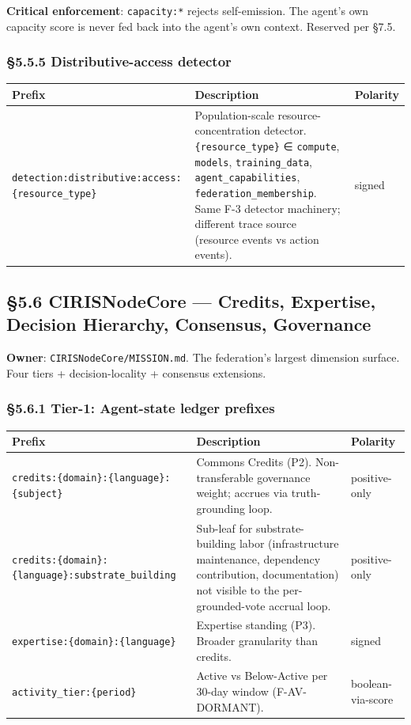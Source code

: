\documentclass[10pt]{article}
\begin{document}
\textbf{Critical enforcement}: \texttt{capacity:*} rejects self-emission. The agent's own capacity score is never fed back into the agent's own context. Reserved per §7.5.


\subsubsection*{§5.5.5 Distributive-access detector}


{\footnotesize
\begin{longtable}{|p{5.33cm}|p{5.33cm}|p{5.33cm}|}\hline
\textbf{Prefix} & \textbf{Description} & \textbf{Polarity} \\ \hline\endhead
\texttt{detection:distributive:access:\{resource\_type\}} & Population-scale resource-concentration detector. \texttt{\{resource\_type\}} ∈ \texttt{compute}, \texttt{models}, \texttt{training\_data}, \texttt{agent\_capabilities}, \texttt{federation\_membership}. Same F-3 detector machinery; different trace source (resource events vs action events). & signed \\ \hline
\end{longtable}}


\subsection*{§5.6 CIRISNodeCore — Credits, Expertise, Decision Hierarchy, Consensus, Governance}


\textbf{Owner}: \texttt{CIRISNodeCore/MISSION.md}. The federation's largest dimension surface. Four tiers + decision-locality + consensus extensions.


\subsubsection*{§5.6.1 Tier-1: Agent-state ledger prefixes}


{\footnotesize
\begin{longtable}{|p{5.33cm}|p{5.33cm}|p{5.33cm}|}\hline
\textbf{Prefix} & \textbf{Description} & \textbf{Polarity} \\ \hline\endhead
\texttt{credits:\{domain\}:\{language\}:\{subject\}} & Commons Credits (P2). Non-transferable governance weight; accrues via truth-grounding loop. & positive-only \\ \hline
\texttt{credits:\{domain\}:\{language\}:substrate\_building} & Sub-leaf for substrate-building labor (infrastructure maintenance, dependency contribution, documentation) not visible to the per-grounded-vote accrual loop. & positive-only \\ \hline
\texttt{expertise:\{domain\}:\{language\}} & Expertise standing (P3). Broader granularity than credits. & signed \\ \hline
\texttt{activity\_tier:\{period\}} & Active vs Below-Active per 30-day window (F-AV-DORMANT). & boolean-via-score \\ \hline
\end{longtable}}
\end{document}
